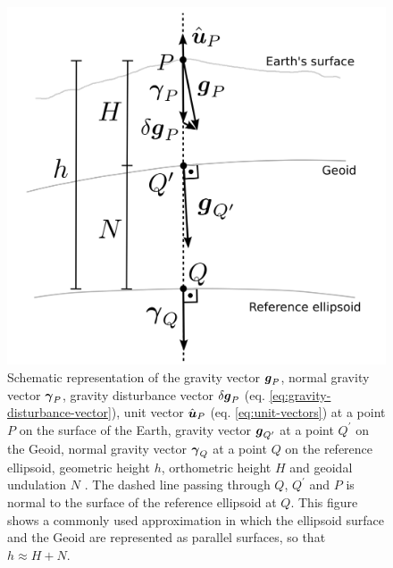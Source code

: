 \documentclass[extra]{gji}
\begin{document}
\begin{figure}
    \includegraphics{figures/surfaces.png}
    \caption{Schematic representation of the gravity vector
        $\mitbf{g}_{P}$, normal gravity vector $\mitbf{\gamma}_{P}$,
        gravity disturbance vector $\delta \mitbf{g}_{P}$
        (eq. \ref{eq:gravity-disturbance-vector}), unit vector
        $\hat{\mitbf{u}}_{P}$ (eq. \ref{eq:unit-vectors}) at a point $P$
        on the surface of the Earth, gravity vector $\mitbf{g}_{Q^{\prime}}$
        at a point $Q^{\prime}$ on the Geoid, normal gravity vector
        $\mitbf{\gamma}_{Q}$ at a point $Q$ on the reference ellipsoid,
        geometric height $h$, orthometric height $H$ and geoidal undulation
        $N$ \citep{heiskanen-moritz1967}.
        The dashed line passing through
        $Q$, $Q^{\prime}$ and $P$ is normal to the
        surface of the reference ellipsoid at $Q$. This figure
        shows a commonly used approximation in which the ellipsoid
        surface and the Geoid are represented as parallel surfaces,
        so that $h \approx H + N$.}
  \label{fig:surfaces}
\end{figure}

\label{lastpage}
\end{document}
